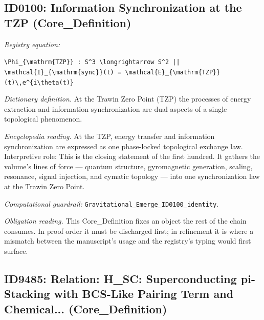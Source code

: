 \documentclass[11pt]{article}
\theoremstyle{remark}
\begin{document}
\subsection{ID0100: Information Synchronization at the TZP (Core\_Definition)}

\noindent\textit{Registry equation:}\par
{\small\texttt{\textbackslash{}Phi\_\{\textbackslash{}mathrm\{TZP\}\} : S\textasciicircum{}3 \textbackslash{}longrightarrow S\textasciicircum{}2 || \textbackslash{}mathcal\{I\}\_\{\textbackslash{}mathrm\{sync\}\}(t) = \textbackslash{}mathcal\{E\}\_\{\textbackslash{}mathrm\{TZP\}\}(t)\textbackslash{},e\textasciicircum{}\{i\textbackslash{}theta(t)\}}}\par\medskip
\noindent\textit{Dictionary definition.} At the Trawin Zero Point (TZP) the processes of energy extraction and information synchronization are dual aspects of a single topological phenomenon.\par\medskip
\noindent\textit{Encyclopedia reading.} At the TZP, energy transfer and information synchronization are expressed as one phase-locked topological exchange law. Interpretive role: This is the closing statement of the first hundred. It gathers the volume's lines of force --- quantum structure, gyromagnetic generation, scaling, resonance, signal injection, and cymatic topology --- into one synchronization law at the Trawin Zero Point.
\par\medskip\noindent\textit{Computational guardrail:} \texttt{Gravitational\_Emerge\_ID0100\_identity}.
\par\medskip\noindent\textit{Obligation reading.} This Core\_Definition fixes an object the rest of the chain consumes. In proof order it must be discharged first; in refinement it is where a mismatch between the manuscript's usage and the registry's typing would first surface.

\subsection{ID9485: Relation: H\_SC: Superconducting pi-Stacking with BCS-Like Pairing Term and Chemical... (Core\_Definition)}
\end{document}
